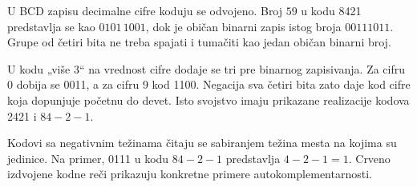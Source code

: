 U BCD zapisu decimalne cifre koduju se odvojeno. Broj $59$ u kodu 8421 predstavlja se kao $0101\,1001$, dok je običan binarni zapis istog broja $00111011$. Grupe od četiri bita ne treba spajati i tumačiti kao jedan običan binarni broj.

U kodu „više 3“ na vrednost cifre dodaje se tri pre binarnog zapisivanja. Za cifru 0 dobija se 0011, a za cifru 9 kod 1100. Negacija sva četiri bita zato daje kod cifre koja dopunjuje početnu do devet. Isto svojstvo imaju prikazane realizacije kodova 2421 i $84{-}2{-}1$.

Kodovi sa negativnim težinama čitaju se sabiranjem težina mesta na kojima su jedinice. Na primer, 0111 u kodu $84{-}2{-}1$ predstavlja $4-2-1=1$. Crveno izdvojene kodne reči prikazuju konkretne primere autokomplementarnosti.
